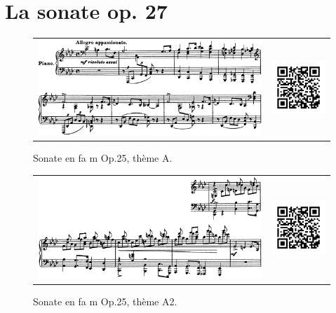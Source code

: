 
\chapter{La sonate op. 27}

\begin{figure}[!p]
  \begin{bigcenter}
    \begin{tabular}{lr}
      \includegraphics[width=12.5cm, keepaspectratio]{sonate-theme-A.png}
      &
      \includegraphics[width=3cm, keepaspectratio]{op1-qr.png}
    \end{tabular}
  \end{bigcenter}
  \caption{\label{sonate-theme-1}Sonate en fa m Op.25, thème A.}
\end{figure}

\begin{figure}[!ht]
  \begin{bigcenter}
    \begin{tabular}{lr}
      \includegraphics[width=12.5cm, keepaspectratio]{sonate-theme-A2.png}
      &
      \includegraphics[width=3cm, keepaspectratio]{op1-qr.png}
    \end{tabular}
  \end{bigcenter}
  \caption{\label{sonate-theme-1}Sonate en fa m Op.25, thème A2.}
\end{figure}

